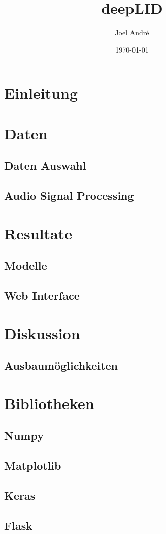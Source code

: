 \documentclass[12pt,twoside]{article}
\title{deepLID}
\author{Joel André}
\date{\today{}}
\begin{document}
	
	
	
	\tableofcontents
	\newpage
	
	\section{Einleitung}
	
	\section{Daten}
	\subsection{Daten Auswahl}
	\subsection{Audio Signal Processing}
	\section{Resultate}
	\subsection{Modelle}
	\subsection{Web Interface}
	\section{Diskussion}
	\subsection{Ausbaumöglichkeiten}
	\section{Bibliotheken}
	\subsection{Numpy}
	\subsection{Matplotlib}
	\subsection{Keras}
	\subsection{Flask}
	
	\printbibliography
	\listoffigures
\end{document}
